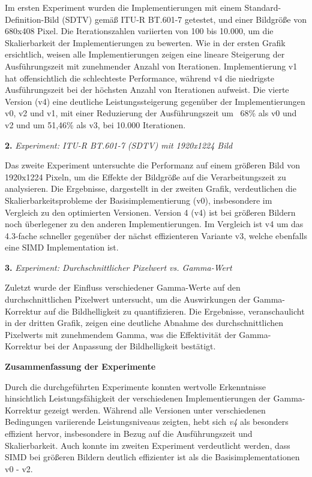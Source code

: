 \documentclass[course=erap]{aspdoc}
\begin{document}
Im ersten Experiment wurden die Implementierungen mit einem Standard-Definition-Bild (SDTV) gemäß ITU-R BT.601-7 getestet, und einer Bildgröße von 680x408 Pixel. Die Iterationszahlen variierten von 100 bis 10.000, um die Skalierbarkeit der Implementierungen zu bewerten. Wie in der ersten Grafik ersichtlich, weisen alle Implementierungen zeigen eine lineare Steigerung der Ausführungszeit mit zunehmender Anzahl von Iterationen. Implementierung v1 hat offensichtlich die schlechteste Performance, während v4 die niedrigste Ausführungszeit bei der höchsten Anzahl von Iterationen aufweist. Die vierte Version (v4) eine deutliche Leistungssteigerung gegenüber der Implementierungen v0, v2 und v1, mit einer Reduzierung der Ausführungszeit um ~68\% als v0 und v2 und um 51,46\% als v3, bei 10.000 Iterationen.

\textbf{2.} \textit{Experiment: ITU-R BT.601-7 (SDTV) mit 1920x1224 Bild}

Das zweite Experiment untersuchte die Performanz auf einem größeren Bild von 1920x1224 Pixeln, um die Effekte der Bildgröße auf die Verarbeitungszeit zu analysieren. Die Ergebnisse, dargestellt in der zweiten Grafik, verdeutlichen die Skalierbarkeitsprobleme der Basisimplementierung (v0), insbesondere im Vergleich zu den optimierten Versionen. Version 4 (v4) ist bei größeren Bildern noch überlegener zu den anderen Implementierungen. Im Vergleich ist v4 um das 4.3-fache schneller gegenüber der nächst effizienteren Variante v3, welche ebenfalls eine SIMD Implementation ist. 

\textbf{3.} \textit{Experiment: Durchschnittlicher Pixelwert vs. Gamma-Wert}

Zuletzt wurde der Einfluss verschiedener Gamma-Werte auf den durchschnittlichen Pixelwert untersucht, um die Auswirkungen der Gamma-Korrektur auf die Bildhelligkeit zu quantifizieren. Die Ergebnisse, veranschaulicht in der dritten Grafik, zeigen eine deutliche Abnahme des durchschnittlichen Pixelwerts mit zunehmendem Gamma, was die Effektivität der Gamma-Korrektur bei der Anpassung der Bildhelligkeit bestätigt. \par

\textbf{Zusammenfassung der Experimente} \par
Durch die durchgeführten Experimente konnten wertvolle Erkenntnisse hinsichtlich Leistungsfähigkeit der verschiedenen Implementierungen der Gamma-Korrektur gezeigt werden. Während alle Versionen unter verschiedenen Bedingungen variierende Leistungsniveaus zeigten, hebt sich \textit{v4} als besonders effizient hervor, insbesondere in Bezug auf die Ausführungszeit und Skalierbarkeit. Auch konnte im zweiten Experiment verdeutlicht werden, dass SIMD bei größeren Bildern deutlich effizienter ist als die Basisimplementationen v0 - v2.
\end{document}
